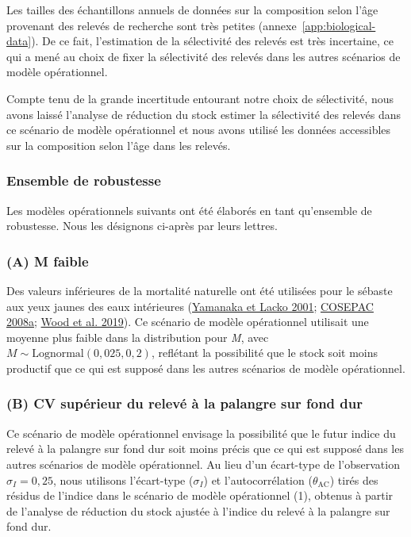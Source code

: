 \documentclass[french,11pt]{book}
\begin{document}
Les tailles des échantillons annuels de données sur la composition selon l'âge provenant des relevés de recherche sont très petites (annexe~\ref{app:biological-data}). De ce fait, l'estimation de la sélectivité des relevés est très incertaine, ce qui a mené au choix de fixer la sélectivité des relevés dans les autres scénarios de modèle opérationnel.

Compte tenu de la grande incertitude entourant notre choix de sélectivité, nous avons laissé l'analyse de réduction du stock estimer la sélectivité des relevés dans ce scénario de modèle opérationnel et nous avons utilisé les données accessibles sur la composition selon l'âge dans les relevés.

\hypertarget{sec:approach3-robustness}{%
\subsubsection{Ensemble de robustesse}\label{sec:approach3-robustness}}

Les modèles opérationnels suivants ont été élaborés en tant qu'ensemble de robustesse. Nous les désignons ci-après par leurs lettres.

\hypertarget{sec:approach3-referenceA}{%
\subsubsection{(A) M faible}\label{sec:approach3-referenceA}}

Des valeurs inférieures de la mortalité naturelle ont été utilisées pour le sébaste aux yeux jaunes des eaux intérieures (\protect\hyperlink{ref-yamanaka2001}{Yamanaka et Lacko 2001}; \protect\hyperlink{ref-cosewic2008}{COSEPAC 2008a}; \protect\hyperlink{ref-wood2019}{Wood et al. 2019}). Ce scénario de modèle opérationnel utilisait une moyenne plus faible dans la distribution pour \emph{M}, avec \(M \sim \textrm{Lognormal}(0,025, 0,2)\), reflétant la possibilité que le stock soit moins productif que ce qui est supposé dans les autres scénarios de modèle opérationnel.

\hypertarget{sec:approach3-referenceB}{%
\subsubsection{(B) CV supérieur du relevé à la palangre sur fond dur}\label{sec:approach3-referenceB}}

Ce scénario de modèle opérationnel envisage la possibilité que le futur indice du relevé à la palangre sur fond dur soit moins précis que ce qui est supposé dans les autres scénarios de modèle opérationnel. Au lieu d'un écart-type de l'observation \(\sigma_I = 0,25\), nous utilisons l'écart-type (\(\sigma_I\)) et l'autocorrélation (\(\theta_\textrm{AC}\)) tirés des résidus de l'indice dans le scénario de modèle opérationnel (1), obtenus à partir de l'analyse de réduction du stock ajustée à l'indice du relevé à la palangre sur fond dur.
\end{document}
